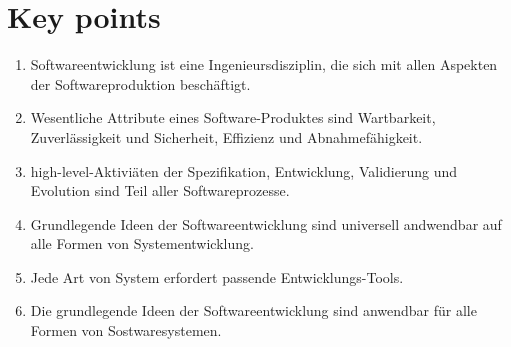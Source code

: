 \section{Key points}
\begin{enumerate}
    \item Softwareentwicklung ist eine Ingenieursdisziplin, die sich mit allen Aspekten der Softwareproduktion beschäftigt. 
    \item Wesentliche Attribute eines Software-Produktes sind Wartbarkeit, Zuverlässigkeit und Sicherheit, Effizienz und Abnahmefähigkeit.
    \item high-level-Aktiviäten der Spezifikation, Entwicklung, Validierung und Evolution sind Teil aller Softwareprozesse.
    \item Grundlegende Ideen der Softwareentwicklung sind universell andwendbar auf alle Formen von Systementwicklung.
    \item Jede Art von System erfordert passende Entwicklungs-Tools.
    \item Die grundlegende Ideen der Softwareentwicklung sind anwendbar für alle Formen von Sostwaresystemen. 
\end{enumerate}

